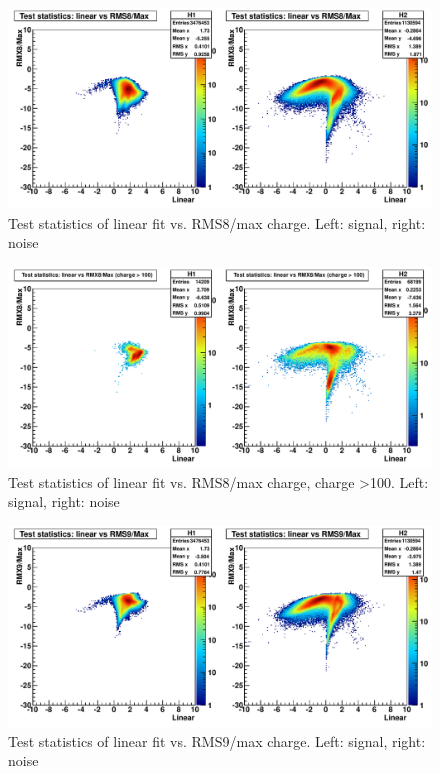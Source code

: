 \begin{figure}
\includegraphics[width=120mm]{DailyLog/6321/6321HTestStatisticsLinearVsRMS8OverMaxCharge.pdf}
\caption{Test statistics of linear fit vs. RMS8/max charge.  Left: signal, right: noise}
\label{Figure_6321HTestStatisticsLinearVsRMS8OverMaxCharge}
\end{figure}

\begin{figure}
\includegraphics[width=120mm]{DailyLog/6321/6321HTestStatisticsLinearVsRMS8OverMaxCharge100.pdf}
\caption{Test statistics of linear fit vs. RMS8/max charge, charge \textgreater 100.  Left: signal, right: noise}
\label{Figure_6321HTestStatisticsLinearVsRMS8OverMaxCharge100}
\end{figure}

\begin{figure}
\includegraphics[width=120mm]{DailyLog/6321/6321HTestStatisticsLinearVsRMS9OverMaxCharge.pdf}
\caption{Test statistics of linear fit vs. RMS9/max charge.  Left: signal, right: noise}
\label{Figure_6321HTestStatisticsLinearVsRMS9OverMaxCharge}
\end{figure}


